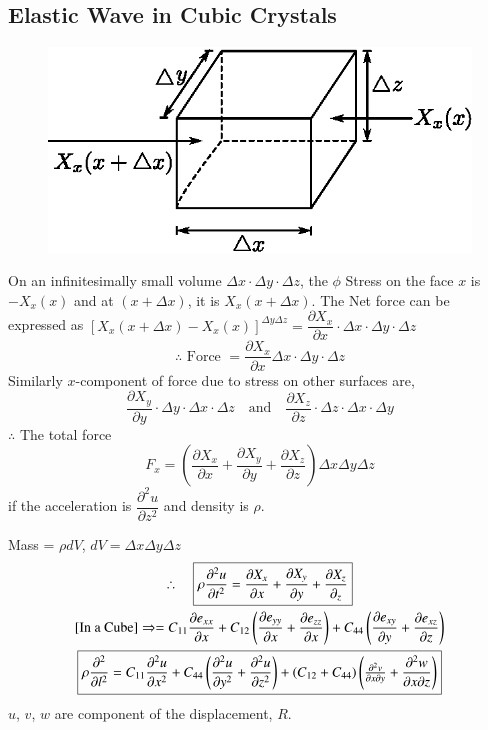 \chapter[Lecture 17]{}\label{lec17}

\section*{Elastic Wave in Cubic Crystals}
\begin{figure}[H]
\centering
\includegraphics{images/lecture17/fig1.eps}
\end{figure}
On an infinitesimally small volume $\Delta x \cdot \Delta y \cdot \Delta z$, the $\phi$ Stress on the face $x$ is $-X_{x}(x)$ and at $(x+\Delta x)$, it is $X_{x}(x+\Delta x)$. The Net force can be expressed as $[X_{x}(x+\Delta x)-X_{x}(x)]^{\Delta y\Delta z}=\dfrac{\partial X_{x}}{\partial x} \cdot \Delta x \cdot \Delta y \cdot \Delta z$
$$
\therefore \text{ Force } =\dfrac{\partial X_{x}}{\partial x}\Delta x \cdot \Delta y \cdot \Delta z
$$
Similarly $x$-component of force due to stress on other surfaces are,
$$
\frac{\partial X_{y}}{\partial y}\cdot \Delta y\cdot \Delta x\cdot \Delta z\quad \text{and}\quad \frac{\partial X_{z}}{\partial z}\cdot \Delta z\cdot \Delta x\cdot \Delta y
$$
$\therefore$ The total force
$$
F_{x}=\left(\frac{\partial X_{x}}{\partial x}+\frac{\partial X_{y}}{\partial y}+\frac{\partial X_{z}}{\partial z}\right)\Delta x \Delta y \Delta z
$$
if the acceleration is $\dfrac{\partial^{2}u}{\partial z^{2}}$ and density is $\rho$.

Mass = $\rho dV$, $dV=\Delta x \Delta y \Delta z$
\begin{gather*}
\therefore\quad \fbox{$\rho \dfrac{\partial^{2}u}{\partial t^{2}}=\dfrac{\partial X_{x}}{\partial x}+\dfrac{\partial X_{y}}{\partial y}+\dfrac{\partial X_{z}}{\partial_{z}}$}\\
\text{[In a Cube]}\Rightarrow = C_{11}\dfrac{\partial e_{xx}}{\partial x}+C_{12}\left(\dfrac{\partial e_{yy}}{\partial x}+\dfrac{\partial e_{zz}}{\partial x}\right)+C_{44}\left(\dfrac{\partial e_{xy}}{\partial y}+\dfrac{\partial e_{xz}}{\partial z}\right)\\
\fbox{$\rho \dfrac{\partial^{2}}{\partial l^{2}}=C_{11}\dfrac{\partial^{2}u}{\partial x^{2}}+C_{44}\left(\dfrac{\partial^{2}u}{\partial y^{2}}+\dfrac{\partial^{2}u}{\partial z^{2}}\right)+(C_{12}+C_{44})\left(\frac{\partial^{2}v}{\partial x\partial y}+\dfrac{\partial^{2}w}{\partial x\partial z}\right)$}
\end{gather*}
$u$, $v$, $w$ are component of the displacement, $R$.

